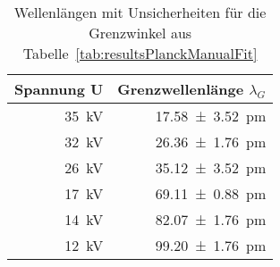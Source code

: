 \begin{table}[h!]
    \centering
    \small
    \caption{Wellenl\"angen mit Unsicherheiten f\"ur die Grenzwinkel aus Tabelle~\ref{tab:resultsPlanckManualFit}}~\label{tab:resultsPlanckWavelengths}
    \begin{tabular}{rr}
        \toprule
        Spannung U          & Grenzwellenl\"ange $\lambda_G$     \\
        \midrule
        \SI{35}{\kilo\volt} &       \SI{17.58 \pm 3.52}{\pico\meter} \\
        \SI{32}{\kilo\volt} &       \SI{26.36 \pm 1.76}{\pico\meter} \\
        \SI{26}{\kilo\volt} &       \SI{35.12 \pm 3.52}{\pico\meter} \\
        \SI{17}{\kilo\volt} &       \SI{69.11 \pm 0.88}{\pico\meter} \\
        \SI{14}{\kilo\volt} &       \SI{82.07 \pm 1.76}{\pico\meter} \\
        \SI{12}{\kilo\volt} &       \SI{99.20 \pm 1.76}{\pico\meter} \\
        \bottomrule
    \end{tabular}
\end{table}


%
